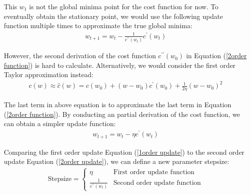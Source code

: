 \documentclass{article}
\begin{document}
This $w_1$ is not the global minima point for the cost function for now. To eventually obtain the stationary point, we would use the following update function multiple times to approximate the true global minima:
\begin{equation}
    \begin{aligned}
        w_{t+1} = w_t - \frac{1}{c^{\prime \prime}(w_t)}c^{\prime}(w_t)
    \end{aligned}
\end{equation}

However, the second derivation of the cost function $c^{\prime \prime}(w_0)$ in Equation (\ref{2order function}) is hard to calculate. Alternatively, we would consider the first order Taylor approximation instead:
\begin{equation}
    \begin{aligned}
        c(w) \approx \hat{c}(w) = c(w_0) + (w-w_0)c^{\prime}(w_0) + \frac{1}{2\eta} (w-w_0)^{2}
    \end{aligned}
\end{equation}

The last term in above equation is to approximate the last term in Equation (\ref{2order function}). By conducting an partial derivation of the cost function, we can obtain a simpler update function:
\begin{equation}\label{1order update}
    \begin{aligned}
        w_{t+1} = w_t - \eta c^{\prime}(w_t)
    \end{aligned}
\end{equation}

Comparing the first order update Equation (\ref{1order update}) to the second order update Equation (\ref{2order update}), we can define a new parameter stepsize:
\begin{equation}
    \begin{aligned}
        \text{Stepsize} = 
        \left\{
            \begin{array}{lr}
            \eta & \text{First order update function}\\[3ex]
            \frac{1}{c^{\prime \prime}(w_t)} & \text{Second order update function}
            \end{array}
        \right.
    \end{aligned}
\end{equation}
\end{document}
